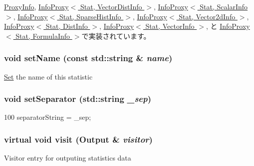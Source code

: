 \hyperlink{classStats_1_1ProxyInfo_ad20897c5c8bd47f5d4005989bead0e55}{ProxyInfo}, \hyperlink{classStats_1_1InfoProxy_ad20897c5c8bd47f5d4005989bead0e55}{InfoProxy$<$ Stat, VectorDistInfo $>$}, \hyperlink{classStats_1_1InfoProxy_ad20897c5c8bd47f5d4005989bead0e55}{InfoProxy$<$ Stat, ScalarInfo $>$}, \hyperlink{classStats_1_1InfoProxy_ad20897c5c8bd47f5d4005989bead0e55}{InfoProxy$<$ Stat, SparseHistInfo $>$}, \hyperlink{classStats_1_1InfoProxy_ad20897c5c8bd47f5d4005989bead0e55}{InfoProxy$<$ Stat, Vector2dInfo $>$}, \hyperlink{classStats_1_1InfoProxy_ad20897c5c8bd47f5d4005989bead0e55}{InfoProxy$<$ Stat, DistInfo $>$}, \hyperlink{classStats_1_1InfoProxy_ad20897c5c8bd47f5d4005989bead0e55}{InfoProxy$<$ Stat, VectorInfo $>$}, と \hyperlink{classStats_1_1InfoProxy_ad20897c5c8bd47f5d4005989bead0e55}{InfoProxy$<$ Stat, FormulaInfo $>$}で実装されています。\hypertarget{classStats_1_1Info_a9d3a2685df23b5e7cbf59c19c4a1f9b5}{
\subsubsection[{setName}]{\setlength{\rightskip}{0pt plus 5cm}void setName (const std::string \& {\em name})}}
\label{classStats_1_1Info_a9d3a2685df23b5e7cbf59c19c4a1f9b5}
\hyperlink{classSet}{Set} the name of this statistic \hypertarget{classStats_1_1Info_a4d6e1ca4231c7f60458b9ba2545f534f}{
\subsubsection[{setSeparator}]{\setlength{\rightskip}{0pt plus 5cm}void setSeparator (std::string {\em \_\-sep})}}
\label{classStats_1_1Info_a4d6e1ca4231c7f60458b9ba2545f534f}



\begin{DoxyCode}
100 { separatorString = _sep;}
\end{DoxyCode}
\hypertarget{classStats_1_1Info_a98d7011c51fa7058e7812bafc913f69a}{
\subsubsection[{visit}]{\setlength{\rightskip}{0pt plus 5cm}virtual void visit ({\bf Output} \& {\em visitor})}}
\label{classStats_1_1Info_a98d7011c51fa7058e7812bafc913f69a}
Visitor entry for outputing statistics data 

